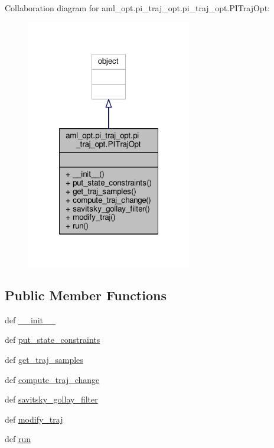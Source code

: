 Collaboration diagram for aml\-\_\-opt.\-pi\-\_\-traj\-\_\-opt.\-pi\-\_\-traj\-\_\-opt.\-P\-I\-Traj\-Opt\-:
\nopagebreak
\begin{figure}[H]
\begin{center}
\leavevmode
\includegraphics[width=204pt]{classaml__opt_1_1pi__traj__opt_1_1pi__traj__opt_1_1_p_i_traj_opt__coll__graph}
\end{center}
\end{figure}
\subsection*{Public Member Functions}
\begin{DoxyCompactItemize}
\item 
def \hyperlink{classaml__opt_1_1pi__traj__opt_1_1pi__traj__opt_1_1_p_i_traj_opt_a0a71f80fcff8bdf8328ae0a532125e1d}{\-\_\-\-\_\-init\-\_\-\-\_\-}
\item 
def \hyperlink{classaml__opt_1_1pi__traj__opt_1_1pi__traj__opt_1_1_p_i_traj_opt_a4005747e098a9549c82f7c4905a071a7}{put\-\_\-state\-\_\-constraints}
\item 
def \hyperlink{classaml__opt_1_1pi__traj__opt_1_1pi__traj__opt_1_1_p_i_traj_opt_a9048ee7c5eefabd1b60cb9ae8a4110ed}{get\-\_\-traj\-\_\-samples}
\item 
def \hyperlink{classaml__opt_1_1pi__traj__opt_1_1pi__traj__opt_1_1_p_i_traj_opt_a29e2be5e4e1269619e32fc8526d9fe09}{compute\-\_\-traj\-\_\-change}
\item 
def \hyperlink{classaml__opt_1_1pi__traj__opt_1_1pi__traj__opt_1_1_p_i_traj_opt_adbdd2dacb2bf0a3abe79752034074d0c}{savitsky\-\_\-gollay\-\_\-filter}
\item 
def \hyperlink{classaml__opt_1_1pi__traj__opt_1_1pi__traj__opt_1_1_p_i_traj_opt_ab61b672735f26076de753af61ad0fd6c}{modify\-\_\-traj}
\item 
def \hyperlink{classaml__opt_1_1pi__traj__opt_1_1pi__traj__opt_1_1_p_i_traj_opt_a98370ec436863fadd75ccc95ed4eaa83}{run}
\end{DoxyCompactItemize}


